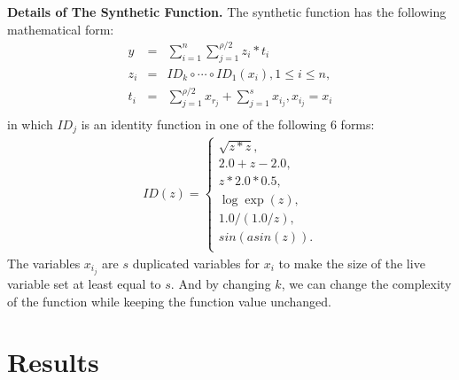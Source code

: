 \documentclass[final,leqno,onefignum,onetabnum]{siamart}
\begin{document}
{\bf Details of The Synthetic Function. }
The synthetic function has the following mathematical form:
\begin{eqnarray*}
y &=& \sum\limits_{i=1}^{n} \sum\limits_{j=1}^{\rho/2} z_i * t_i \\ 
z_i &=& ID_k \circ \cdots \circ ID_1 (x_i), 1 \le i \le n, \\
t_i &=& \sum\limits_{j=1}^{\rho/2} x_{r_j} + \sum\limits_{j=1}^{s} x_{i_j}, x_{i_j} = x_i \\
\end{eqnarray*}
in which $ID_j$ is an identity function in one of the following $6$ forms:
\begin{eqnarray*}
ID(z) = 
\begin{cases}
\sqrt{z * z}, \\
2.0 + z - 2.0, \\
z * 2.0 * 0.5, \\
\log \exp(z), \\
1.0 / (1.0 / z), \\
sin(asin(z)). \\
\end{cases}
\end{eqnarray*}
The variables $x_{i_j}$ are $s$ duplicated variables for $x_i$ to make the size of the live variable set at least equal to $s$. And by changing $k$, we can change the complexity of the function while keeping the function value unchanged.


\section*{Results}
\end{document}
